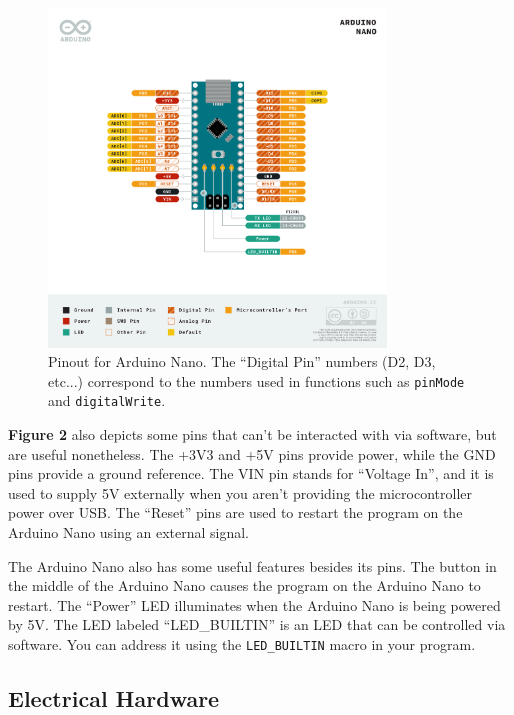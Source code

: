 \documentclass{article}
\begin{document}
\begin{figure}[ht]
    \centering
    \includegraphics[width = 0.8\textwidth]{images/ArduinoNanoPinout.png}
    \cprotect\caption{Pinout for Arduino Nano. The ``Digital Pin'' numbers (D2, D3, etc...) 
    correspond to the numbers used in functions such as \verb|pinMode| and \verb|digitalWrite|.}
\end{figure}

\newpage

{\bf Figure 2} also depicts some pins that can't be interacted with via software, but are useful nonetheless. The +3V3 and +5V pins provide power, while the GND pins provide a ground reference. The VIN pin stands for ``Voltage In'', and it is used to supply 5V externally when you aren't providing the microcontroller power over USB. The ``Reset'' pins are used to restart the program on the Arduino Nano using an external signal. \par

The Arduino Nano also has some useful features besides its pins. The button in the middle of the Arduino Nano causes the program on the Arduino Nano to restart. The ``Power'' LED illuminates when the Arduino Nano is being powered by 5V. The LED labeled ``LED\_BUILTIN'' is an LED that can be controlled via software. You can address it using the \verb|LED_BUILTIN| macro in your program.

\subsection{Electrical Hardware}
\end{document}
